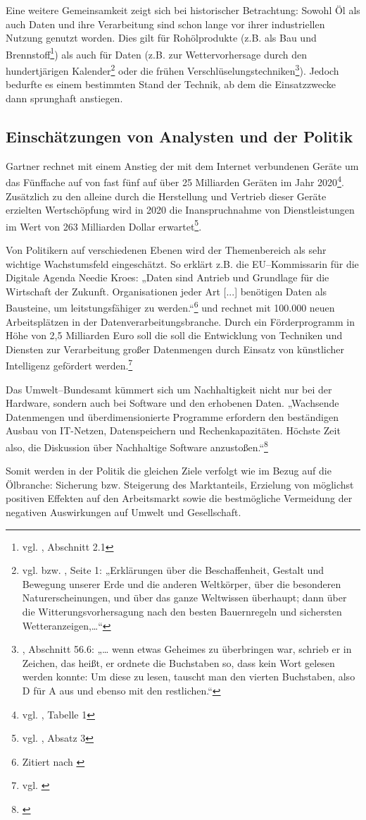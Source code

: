 Eine weitere Gemeinsamkeit zeigt sich bei historischer Betrachtung: Sowohl Öl als auch Daten und ihre Verarbeitung sind schon lange vor ihrer industriellen Nutzung genutzt worden. Dies gilt für Rohölprodukte (z.B. als Bau und Brennstoff\footnote{vgl. \cite{pressler}, Abschnitt 2.1}) als auch für Daten (z.B. zur Wettervorhersage durch den hundertjärigen Kalender\footnote{vgl. \cite{dwd} bzw. \cite{knauer100}, Seite 1: „Erklärungen über die Beschaffenheit, Gestalt und Bewegung unserer Erde und die anderen Weltkörper, über die besonderen Naturerscheinungen, und über das ganze Weltwissen überhaupt; dann über die Witterungsvorhersagung nach den besten Bauernregeln und sichersten Wetteranzeigen,…“} oder die frühen Verschlüselungstechniken\footnote{\cite{suetonius}, Abschnitt 56.6: „… wenn etwas Geheimes zu überbringen war, schrieb er in Zeichen, das heißt, er ordnete die Buchstaben so, dass kein Wort gelesen werden konnte: Um diese zu lesen, tauscht man den vierten Buchstaben, also D für A aus und ebenso mit den restlichen.“}). Jedoch bedurfte es einem bestimmten Stand der Technik, ab dem die Einsatzzwecke dann sprunghaft anstiegen.

\subsection{Einschätzungen von Analysten und der Politik}
\label{politik}

Gartner rechnet mit einem Anstieg der mit dem Internet verbundenen Geräte um das Fünffache auf von fast fünf auf über 25 Milliarden Geräten im Jahr 2020\footnote{vgl. \cite{gartneriot}, Tabelle 1}. Zusätzlich zu den alleine durch die Herstellung und Vertrieb dieser Geräte erzielten Wertschöpfung wird in 2020 die Inanspruchnahme von Dienstleistungen im Wert von 263 Milliarden Dollar erwartet\footnote{vgl. \cite{gartneriot}, Absatz 3}.

Von Politikern auf verschiedenen Ebenen wird der Themenbereich  als sehr wichtige Wachstumsfeld eingeschätzt. So erklärt z.B. die EU--Kommissarin für die Digitale Agenda Needie Kroes: „Daten sind Antrieb und Grundlage für die Wirtschaft der Zukunft. Organisationen jeder Art [...] benötigen Daten als Bausteine, um leitstungsfähiger zu werden.“\footnote{Zitiert nach \cite{bd25}} und rechnet mit 100.000 neuen Arbeitsplätzen in der Datenverarbeitungsbranche. Durch ein Förderprogramm in Höhe von 2,5 Milliarden Euro soll die soll die Entwicklung von Techniken und Diensten zur Verarbeitung großer Datenmengen durch Einsatz von künstlicher Intelligenz gefördert werden.\footnote{vgl. \cite{bd25}}

Das Umwelt--Bundesamt kümmert sich um Nachhaltigkeit nicht nur bei der Hardware, sondern auch bei Software und den erhobenen Daten. „Wachsende Datenmengen und überdimensionierte Programme erfordern den beständigen Ausbau von IT-Netzen, Datenspeichern und Rechenkapazitäten. Höchste Zeit also, die Diskussion über Nachhaltige Software anzustoßen.“\footnote{\cite{fns}} 

Somit werden in der Politik die gleichen Ziele verfolgt wie im Bezug auf die Ölbranche: Sicherung bzw. Steigerung des Marktanteils, Erzielung von möglichst positiven Effekten auf den Arbeitsmarkt sowie die bestmögliche Vermeidung der negativen Auswirkungen auf Umwelt und Gesellschaft.